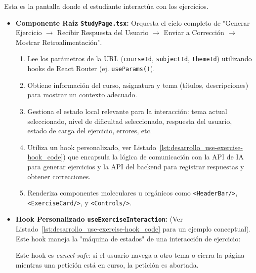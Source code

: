 Esta es la pantalla donde el estudiante interactúa con los ejercicios.
\begin{itemize}[leftmargin=*]
  \item \textbf{Componente Raíz \texttt{StudyPage.tsx}:} Orquesta el ciclo completo de "Generar Ejercicio \(\rightarrow\) Recibir Respuesta del Usuario \(\rightarrow\) Enviar a Corrección \(\rightarrow\) Mostrar Retroalimentación".
        \begin{enumerate}[label=\alph*)]
          \item Lee los parámetros de la URL (\texttt{courseId}, \texttt{subjectId}, \texttt{themeId}) utilizando hooks de React Router (ej. \texttt{useParams()}).
          \item Obtiene información del curso, asignatura y tema (títulos, descripciones) para mostrar un contexto adecuado.
          \item Gestiona el estado local relevante para la interacción: tema actual seleccionado, nivel de dificultad seleccionado, respuesta del usuario, estado de carga del ejercicio, errores, etc.
          \item Utiliza un hook personalizado, ver Listado~\ref{lst:desarrollo_use-exercise-hook_code}) que encapsula la lógica de comunicación con la API de IA para generar ejercicios y la API del backend para registrar respuestas y obtener correcciones.
          \item Renderiza componentes moleculares u orgánicos como \texttt{<HeaderBar/>}, \texttt{<ExerciseCard/>}, y \texttt{<Controls/>}.
        \end{enumerate}

  \item \textbf{Hook Personalizado \texttt{useExerciseInteraction}:} (Ver Listado~\ref{lst:desarrollo_use-exercise-hook_code} para un ejemplo conceptual). Este hook maneja la "máquina de estados" de una interacción de ejercicio:
        Este hook es \emph{cancel-safe}: si el usuario navega a otro tema o cierra la página mientras una petición está en curso, la petición es abortada.


\end{itemize}
